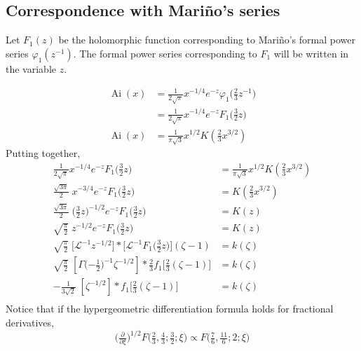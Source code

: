 \documentclass{article}
\theoremstyle{plain}
\newcommand{\laplace}{\mathcal{L}}
\DeclareMathOperator{\Ai}{Ai}
\begin{document}
\subsection{Correspondence with Mari\~{n}o's series}
Let $F_1(z)$ be the holomorphic function corresponding to Mari\~{n}o's formal power series $\varphi_1(z^{-1})$. The formal power series corresponding to $F_1$ will be written in the variable $z$.

\begin{align*}
\Ai(x) & = \tfrac{1}{2\sqrt{\pi}} x^{-1/4} e^{-z} \varphi_1\big(\tfrac{2}{3} z^{-1}\big) \\
& = \tfrac{1}{2\sqrt{\pi}} x^{-1/4} e^{-z} F_1\big(\tfrac{3}{2} z\big) \\
\Ai(x) & = \frac{1}{\pi\sqrt{3}} x^{1/2} K(\tfrac{2}{3} x^{3/2})
\end{align*}
Putting together,
\begin{align*}
\tfrac{1}{2\sqrt{\pi}} x^{-1/4} e^{-z} F_1\big(\tfrac{3}{2} z\big) & = \frac{1}{\pi\sqrt{3}} x^{1/2} K(\tfrac{2}{3} x^{3/2}) \\
\tfrac{\sqrt{3\pi}}{2}\;x^{-3/4} e^{-z} F_1\big(\tfrac{3}{2} z\big) & = K(\tfrac{2}{3} x^{3/2}) \\
\tfrac{\sqrt{3\pi}}{2}\;\big(\tfrac{3}{2} z)^{-1/2} e^{-z} F_1\big(\tfrac{3}{2} z\big) & = K(z) \\
\sqrt{\tfrac{\pi}{2}}\;z^{-1/2} e^{-z} F_1\big(\tfrac{3}{2} z\big) & = K(z) \\
\sqrt{\tfrac{\pi}{2}}\;\big[\laplace^{-1} z^{-1/2}\big] * \big[\laplace^{-1} F_1\big(\tfrac{3}{2} z\big)\big](\zeta - 1) & = k(\zeta) \\
\sqrt{\tfrac{\pi}{2}}\;\left[\Gamma\big({-\tfrac{1}{2}}\big)^{-1} \zeta^{-1/2}\right] * \tfrac{2}{3} f_1\big[\tfrac{2}{3}(\zeta - 1)\big] & = k(\zeta) \\
-\tfrac{1}{3\sqrt{2}}\;\left[\zeta^{-1/2}\right] * f_1\big[\tfrac{2}{3}(\zeta - 1)\big] & = k(\zeta) \\
\end{align*}
Notice that if the hypergeometric differentiation formula holds for fractional derivatives,
\[ \big(\tfrac{\partial}{\partial \xi}\big)^{1/2}F\big(\tfrac{2}{3}, \tfrac{4}{3}; \tfrac{3}{2}; \xi\big) \propto F\big(\tfrac{7}{6}, \tfrac{11}{6}; 2; \xi\big) \]


\end{document}
